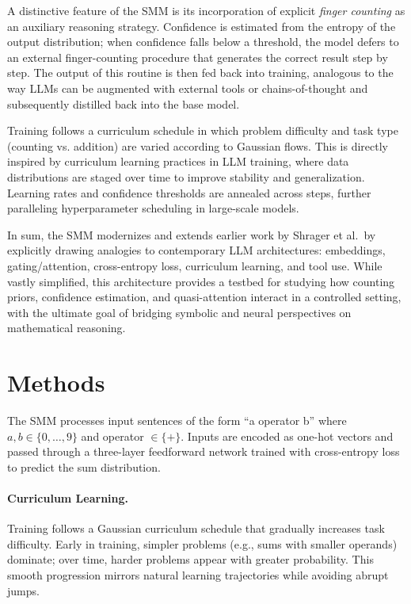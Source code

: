 \documentclass{article}
\begin{document}
A distinctive feature of the SMM is its incorporation of explicit \emph{finger counting} as an auxiliary reasoning strategy. Confidence is estimated from the entropy of the output distribution; when confidence falls below a threshold, the model defers to an external finger-counting procedure that generates the correct result step by step. The output of this routine is then fed back into training, analogous to the way LLMs can be augmented with external tools or chains-of-thought and subsequently distilled back into the base model.

Training follows a curriculum schedule in which problem difficulty and task type (counting vs. addition) are varied according to Gaussian flows. This is directly inspired by curriculum learning practices in LLM training, where data distributions are staged over time to improve stability and generalization. Learning rates and confidence thresholds are annealed across steps, further paralleling hyperparameter scheduling in large-scale models.

In sum, the SMM modernizes and extends earlier work by Shrager et al.\ by explicitly drawing analogies to contemporary LLM architectures: embeddings, gating/attention, cross-entropy loss, curriculum learning, and tool use. While vastly simplified, this architecture provides a testbed for studying how counting priors, confidence estimation, and quasi-attention interact in a controlled setting, with the ultimate goal of bridging symbolic and neural perspectives on mathematical reasoning.


\section{Methods}
The SMM processes input sentences of the form ``a operator b'' where $a,b \in \{0,\ldots,9\}$ and operator $\in \{+\}$. Inputs are encoded as one-hot vectors and passed through a three-layer feedforward network trained with cross-entropy loss to predict the sum distribution.

\paragraph{Curriculum Learning.} Training follows a Gaussian curriculum schedule that gradually increases task difficulty. Early in training, simpler problems (e.g., sums with smaller operands) dominate; over time, harder problems appear with greater probability. This smooth progression mirrors natural learning trajectories while avoiding abrupt jumps.
\end{document}

